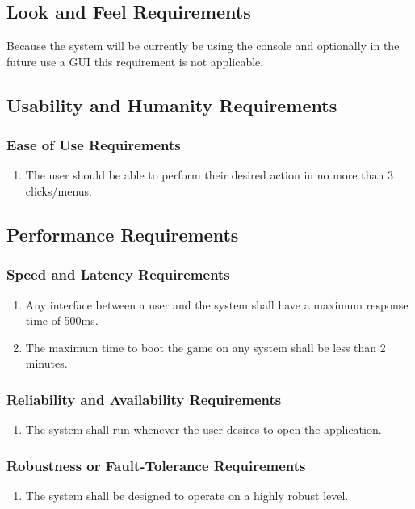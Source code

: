 \documentclass[12pt, titlepage]{article}
\begin{document}
\subsection{Look and Feel Requirements}
    Because the system will be currently be using the console and optionally in the future use a GUI this requirement is not applicable. 
\subsection{Usability and Humanity Requirements}
    \subsubsection{Ease of Use Requirements}
        \label{ssub:ease_of_use_requirements}
        \begin{enumerate}[label=UH\arabic*.]
            \item The user should be able to perform their desired action in no more than 3 clicks/menus.
        \end{enumerate}
        

\subsection{Performance Requirements}
    \subsubsection{Speed and Latency Requirements}
    \begin{enumerate}[label=PR\arabic*.]
        \item Any interface between a user and the system shall have a maximum response time of 500ms.
        \item The maximum time to boot the game on any system shall be less than 2 minutes.
    \end{enumerate}
    \subsubsection{Reliability and Availability Requirements}
    \begin{enumerate}[label=PR\arabic*.]
        \item The system shall run whenever the user desires to open the application.  
    \end{enumerate}
    \subsubsection{Robustness or Fault-Tolerance Requirements}
    \begin{enumerate}[label=PR\arabic*.]
        \item The system shall be designed to operate on a highly robust level.
    \end{enumerate}
\end{document}
